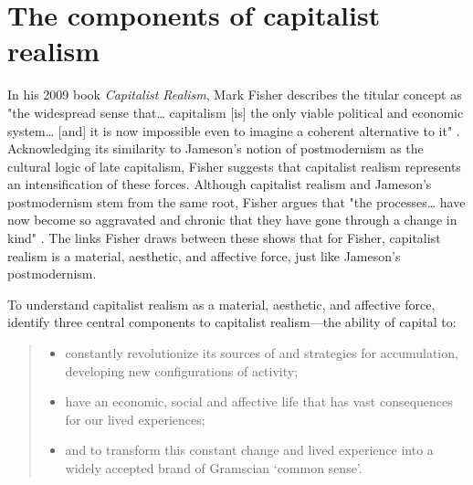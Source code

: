 \section{The components of capitalist realism}
\label{sec:2-components}

In his 2009 book \emph{Capitalist Realism}, Mark Fisher describes the titular concept as "the widespread sense that\ldots{} capitalism [is] the only viable political and economic system\ldots{} [and] it is now impossible even to imagine a coherent alternative to it" \citep[p. 2]{fisher_capitalist_2009}. Acknowledging its similarity to Jameson's \citeyearpar{jameson_postmodernism_1991} notion of postmodernism as the cultural logic of late capitalism, Fisher suggests that capitalist realism represents an intensification of these forces. Although capitalist realism and Jameson's postmodernism stem from the same root, Fisher argues that "the processes\ldots{} have now become so aggravated and chronic that they have gone through a change in kind" \cite[p. 7]{fisher_capitalist_2009}. The links Fisher draws between these shows that for Fisher, capitalist realism is a material, aesthetic, and affective force, just like Jameson's postmodernism. 

To understand capitalist realism as a material, aesthetic, and affective force, \citet[p. 6]{shonkwiler_reading_2014} identify three central components to capitalist realism—the ability of capital to:
\begin{quote}
\begin{itemize}
\item  constantly revolutionize its sources of and strategies for accumulation, developing new configurations of activity;
\item   have an economic, social and affective life that has vast consequences for our lived experiences;
\item  and to transform this constant change and lived experience into a widely accepted brand of Gramscian `common sense'.
\end{itemize}
\end{quote}

